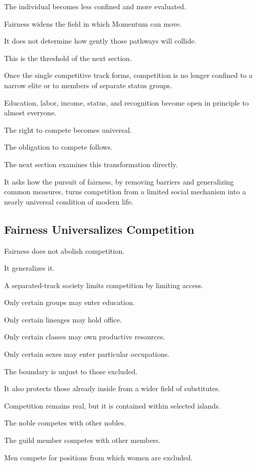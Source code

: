The individual becomes less confined and more evaluated.

Fairness widens the field in which Momentum can move.

It does not determine how gently those pathways will collide.

This is the threshold of the next section.

Once the single competitive track forms, competition is no longer confined to a narrow elite or to members of separate status groups.

Education, labor, income, status, and recognition become open in principle to almost everyone.

The right to compete becomes universal.

The obligation to compete follows.

The next section examines this transformation directly.

It asks how the pursuit of fairness, by removing barriers and generalizing common measures, turns competition from a limited social mechanism into a nearly universal condition of modern life.

\subsection*{\textbf{Fairness Universalizes Competition}}


Fairness does not abolish competition.

It generalizes it.

A separated-track society limits competition by limiting access.

Only certain groups may enter education.

Only certain lineages may hold office.

Only certain classes may own productive resources.

Only certain sexes may enter particular occupations.

The boundary is unjust to those excluded.

It also protects those already inside from a wider field of substitutes.

Competition remains real, but it is contained within selected islands.

The noble competes with other nobles.

The guild member competes with other members.

Men compete for positions from which women are excluded.

